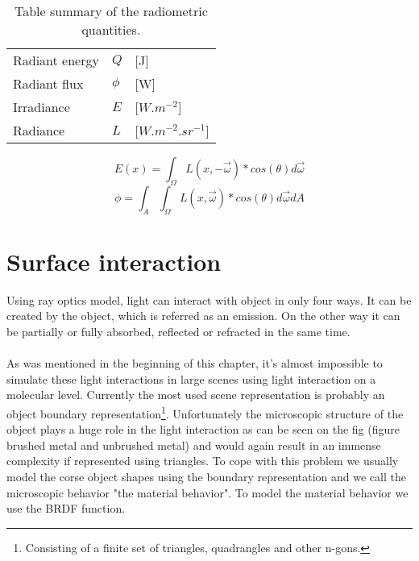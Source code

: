 \begin {table}[H]
\centering
\begin{tabular}{lll}
\hline
Radiant energy&$Q$&[J]\\
Radiant flux&$\phi$&[W]\\ 
Irradiance&$E$&[$W.m^{-2}$]\\ 
Radiance&$L$& [$W.m^{-2}.sr^{-1}$]\\
\hline
\end{tabular}
\caption {Table summary of the radiometric quantities.} \label{tab:title} 
\end{table}


\begin{equation}
E(x)=\int_{\Omega}L(x,-\vec\omega)*cos(\theta)d\vec\omega
\label{eq:IrradianceInt} 
\end{equation}
\begin{equation}
\phi=\int_{A}\int_{\Omega}L(x,\vec\omega)*cos(\theta)d\vec\omega dA
\label{eq:fluxInt} 
\end{equation}

\cite{Dutre01globalillumination} %

\section{Surface interaction}
Using ray optics model, light can interact with object in only four ways. It can be created by the object, which is referred as an emission. On the other way it can be partially or fully absorbed, reflected or refracted in the same time.
\\
\\
As was mentioned in the beginning of this chapter, it's almost impossible to simulate these light interactions in large scenes using light interaction on a molecular level. Currently the most used scene representation is probably an object boundary representation\footnote{Consisting of a finite set of triangles, quadrangles and other n-gons.}. Unfortunately the microscopic structure of the object plays a huge role in the light interaction as can be seen on the fig (figure brushed metal and unbrushed metal) and would again result in an immense complexity if represented using triangles. To cope with this problem we usually model the corse object shapes using the boundary representation and we call the microscopic behavior "the material behavior". To model the material behavior we use the BRDF function.

